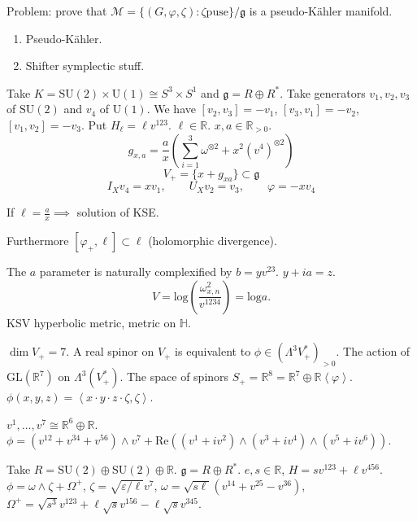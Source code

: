 Problem: prove that
$\mathcal{M}=\{(G,\varphi,\zeta):\zeta\text{
puse}\}/\mathfrak{g}$
is a pseudo-Kähler manifold.

\begin{enumerate}
\item Pseudo-Kähler.
\item Shifter symplectic stuff.
\end{enumerate}

\begin{example}
\label{example-SU2xSU1}
Take $K=\text{SU}(2)\times\text{U}(1)\cong
S^3\times S^1$
and $\mathfrak{g}=R \oplus R^*$.
Take generators $v_1,v_2,v_3$ of
$\text{SU}(2)$ and $v_4$ of $\text{U}(1)$.
We have $[v_2,v_3]=-v_1$, $[v_3,v_1]=-v_2$,
$[v_1,v_2]=-v_3$.
Put $H_\ell=\ell v^{123}$. $\ell \in
\mathbb{R}$. $x,a \in \mathbb{R}_{>0}$.
$$
g_{x,a}=\frac{a}{x}\left(\sum_{i=1}
^3\omega^{\otimes
2}
+x^2 (v^4)^{\otimes 2}\right)
$$
$$
V_+=\{ x+g_{xa}\}\subset \mathfrak{g}
$$
$$
I_X v_4=xv_1,\qquad U_X v_2=v_3, \qquad
\varphi=-xv_4
$$
\end{example}

\begin{exercise}
\label{exercise-solution-of-KSE}
If $\ell=\frac{a}{x} \implies $ solution of
KSE.
\end{exercise}

Furthermore $[\varphi_+,\ell] \subset \ell$
(holomorphic divergence).

The $a$ parameter is naturally complexified
by  $b=yv^{23}$.
$y+ia=z$.
$$
V=\text{log}
\left(\frac{\omega^2_{x,n}}{v^{1234}}\right)=
\text{log}a.
$$
KSV hyperbolic metric, metric on
$\mathbb{H}$.

\medskip\noindent
{\bf $\dim V_+=7$}.
A real spinor on $V_+$ is equivalent to $\phi
\in (\Lambda^{3}V_+^* )_{>0}$.
The action of $\text{GL}(\mathbb{R}^7)$ on
$\Lambda^{3}(V_+^*)$.
The space of spinors $S_+=\mathbb{R}^8
=\mathbb{R}^7\oplus\mathbb{R}
\left\langle{}\varphi\right\rangle{}$.
$\phi(x,y,z)=\left\langle{}x\cdot y\cdot z\cdot
\zeta,\zeta\right\rangle{}$.

\begin{remark}
\label{remark-7}
$v^1,\ldots,v^7 \cong \mathbb{R}^6 \oplus
\mathbb{R}$.
$\phi=(v^{12}+v^{34}+v^{56})\wedge v^7+
\text{Re}((v^1+i
v^2)\wedge(v^3+iv^4)\wedge(v^5+iv^6))$.
\end{remark}

\begin{example}
\label{example-SU2+SU2+R}
Take $R=\text{SU}(2)\oplus \text{SU}(2)\oplus
\mathbb{R}$.
$\mathfrak{g}=R \oplus R^*$.
$e,s \in \mathbb{R}$, $H=sv^{123}+\ell
v^{456}$.
$\phi=\omega \wedge \zeta+\Omega^+$,
$\zeta=\sqrt{\varepsilon/\ell}v^7$,
$\omega=\sqrt{s\ell}(v^{14}+v^{25}-v^{36})$,
$\Omega^+=\sqrt{s^3}v^{123}+\ell
\sqrt{s}v^{156}-\ell \sqrt{s}v^{345}$.
\end{example}


